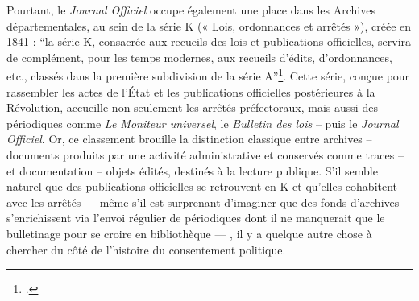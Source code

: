 Pourtant, le \emph{Journal Officiel} occupe également une place dans les Archives départementales, au sein de la série K (« Lois, ordonnances et arrêtés »), créée en 1841 : \enquote{la série K, consacrée aux recueils des lois et publications officielles, servira de complément, pour les temps modernes, aux recueils d’édits, d’ordonnances, etc., classés dans la première subdivision de la série A}\footcite[][]{circulaire}. Cette série, conçue pour rassembler les actes de l’État et les publications officielles postérieures à la Révolution, accueille non seulement les arrêtés préfectoraux, mais aussi des périodiques comme \emph{Le Moniteur universel}, le \emph{Bulletin des lois} -- puis le \emph{Journal Officiel}. Or, ce classement brouille la distinction classique entre archives -- documents produits par une activité administrative et conservés comme traces -- et documentation -- objets édités, destinés à la lecture publique. S’il semble naturel que des publications officielles se retrouvent en K et qu’elles cohabitent avec les arrêtés — même s’il est  surprenant d’imaginer que des fonds d’archives s’enrichissent via  l’envoi régulier de périodiques dont il ne manquerait que le bulletinage pour se croire en bibliothèque — , il y a quelque autre chose à chercher du côté de l’histoire du consentement politique.

